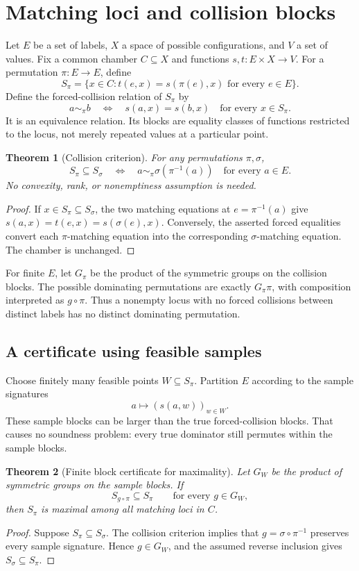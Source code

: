 \documentclass[11pt]{article}
\newtheorem{theorem}{Theorem}
\begin{document}
\section{Matching loci and collision blocks}
Let $E$ be a set of labels, $X$ a space of possible configurations, and $V$ a set of values. Fix a common chamber $C\subseteq X$ and functions $s,t:E\times X\to V$. For a permutation $\pi:E\to E$, define
\[
 S_\pi=\{x\in C: t(e,x)=s(\pi(e),x)\text{ for every }e\in E\}.
\]
Define the forced-collision relation of $S_\pi$ by
\[
 a\sim_\pi b\quad\Longleftrightarrow\quad
 s(a,x)=s(b,x)\quad\text{for every }x\in S_\pi.
\]
It is an equivalence relation. Its blocks are equality classes of functions restricted to the locus, not merely repeated values at a particular point.

\begin{theorem}[Collision criterion]
For any permutations $\pi,\sigma$,
\[
 S_\pi\subseteq S_\sigma
 \quad\Longleftrightarrow\quad
 a\sim_\pi \sigma(\pi^{-1}(a))\quad\text{for every }a\in E.
\]
No convexity, rank, or nonemptiness assumption is needed.
\end{theorem}
\begin{proof}
If $x\in S_\pi\subseteq S_\sigma$, the two matching equations at $e=\pi^{-1}(a)$ give
$s(a,x)=t(e,x)=s(\sigma(e),x)$. Conversely, the asserted forced equalities convert each $\pi$-matching equation into the corresponding $\sigma$-matching equation. The chamber is unchanged.
\end{proof}

For finite $E$, let $G_\pi$ be the product of the symmetric groups on the collision blocks. The possible dominating permutations are exactly $G_\pi\pi$, with composition interpreted as $g\circ\pi$. Thus a nonempty locus with no forced collisions between distinct labels has no distinct dominating permutation.

\subsection{A certificate using feasible samples}
Choose finitely many feasible points $W\subseteq S_\pi$. Partition $E$ according to the sample signatures
\[
 a\longmapsto (s(a,w))_{w\in W}.
\]
These sample blocks can be larger than the true forced-collision blocks. That causes no soundness problem: every true dominator still permutes within the sample blocks.

\begin{theorem}[Finite block certificate for maximality]
Let $G_W$ be the product of symmetric groups on the sample blocks. If
\[
 S_{g\circ\pi}\subseteq S_\pi\qquad\text{for every }g\in G_W,
\]
then $S_\pi$ is maximal among all matching loci in $C$.
\end{theorem}
\begin{proof}
Suppose $S_\pi\subseteq S_\sigma$. The collision criterion implies that $g=\sigma\circ\pi^{-1}$ preserves every sample signature. Hence $g\in G_W$, and the assumed reverse inclusion gives $S_\sigma\subseteq S_\pi$.
\end{proof}
\end{document}
